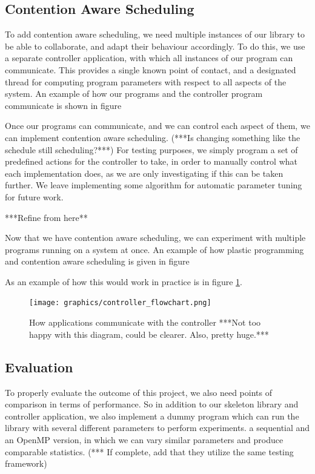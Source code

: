\subsection{Contention Aware Scheduling}

To add contention aware scheduling, we need multiple instances of our library to be able to collaborate, and adapt their behaviour accordingly. To do this, we use a separate controller application, with which all instances of our program can communicate. This provides a single known point of contact, and a designated thread for computing program parameters with respect to all aspects of the system. An example of how our programs and the controller program communicate is shown in figure 

Once our programs can communicate, and we can control each aspect of them, we can implement contention aware scheduling. (***Is changing something like the schedule still scheduling?***) For testing purposes, we simply program a set of predefined actions for the controller to take, in order to manually control what each implementation does, as we are only investigating if this can be taken further. We leave implementing some algorithm for automatic parameter tuning for future work.

***Refine from here**

Now that we have contention aware scheduling, we can experiment with multiple programs running on a system at once. An example of how plastic programming and contention aware scheduling is given in figure

As an example of how this would work in practice is in figure \ref{fig:controller_flowchart}.

\begin{figure}
	\texttt{[image: graphics/controller\_flowchart.png]}
	\caption{How applications communicate with the controller ***Not too happy with this diagram, could be clearer. Also, pretty huge.***}
	\label{fig:controller_flowchart}
\end{figure}



\subsection{Evaluation}

To properly evaluate the outcome of this project, we also need points of comparison in terms of performance. So in addition to our skeleton library and controller application, we also implement a dummy program which can run the library with several different parameters to perform experiments. a sequential and an OpenMP version, in which we can vary similar parameters and produce comparable statistics. (*** If complete, add that they utilize the same testing framework)



